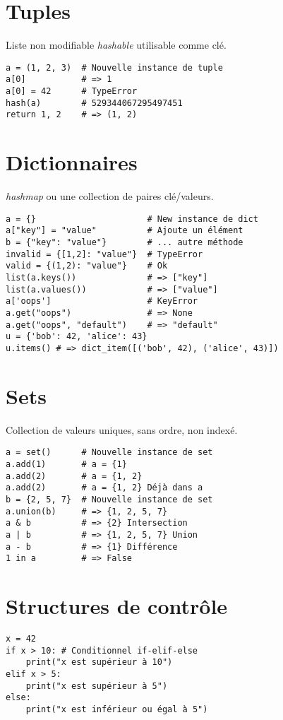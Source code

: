 \documentclass[9pt]{extarticle}
\begin{document}
\begin{multicols*}{4}
\section*{Tuples}
Liste non modifiable \emph{hashable} utilisable comme clé.
\begin{lstlisting}
a = (1, 2, 3)  # Nouvelle instance de tuple
a[0]           # => 1
a[0] = 42      # TypeError
hash(a)        # 529344067295497451
return 1, 2    # => (1, 2)
\end{lstlisting}

\section*{Dictionnaires}
\emph{hashmap} ou une collection de paires clé/valeurs.
\begin{lstlisting}
a = {}                      # New instance de dict
a["key"] = "value"          # Ajoute un élément
b = {"key": "value"}        # ... autre méthode
invalid = {[1,2]: "value"}  # TypeError
valid = {(1,2): "value"}    # Ok
list(a.keys())              # => ["key"]
list(a.values())            # => ["value"]
a['oops']                   # KeyError
a.get("oops")               # => None
a.get("oops", "default")    # => "default"
u = {'bob': 42, 'alice': 43}
u.items() # => dict_item([('bob', 42), ('alice', 43)])
\end{lstlisting}

\section*{Sets}
Collection de valeurs uniques, sans ordre, non indexé.
\begin{lstlisting}
a = set()      # Nouvelle instance de set
a.add(1)       # a = {1}
a.add(2)       # a = {1, 2}
a.add(2)       # a = {1, 2} Déjà dans a
b = {2, 5, 7}  # Nouvelle instance de set
a.union(b)     # => {1, 2, 5, 7}
a & b          # => {2} Intersection
a | b          # => {1, 2, 5, 7} Union
a - b          # => {1} Différence
1 in a         # => False
\end{lstlisting}

\section*{Structures de contrôle}
\begin{lstlisting}
x = 42
if x > 10: # Conditionnel if-elif-else
    print("x est supérieur à 10")
elif x > 5:
    print("x est supérieur à 5")
else:
    print("x est inférieur ou égal à 5")


\end{lstlisting}
\end{multicols*}
\end{document}

